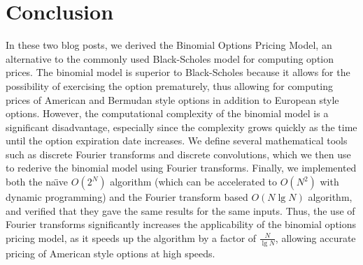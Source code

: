\documentclass[11pt]{article}
\begin{document}
\section*{Conclusion}
In these two blog posts, we derived the Binomial Options Pricing Model, an alternative to the commonly used
Black-Scholes model for computing option prices. The binomial model is superior to Black-Scholes
because it allows for the possibility of exercising the option prematurely, thus allowing for
computing prices of American and Bermudan style options in addition to European style options.
However, the computational complexity of the binomial model is a significant disadvantage,
especially since the complexity grows quickly as the time until the option expiration date
increases. We define several mathematical tools such as discrete Fourier transforms and discrete
convolutions, which we then use to rederive the binomial model using Fourier transforms. Finally, we
implemented both the na\"{\i}ve $O(2^N)$ algorithm (which can be accelerated to $O(N^2)$ with
dynamic programming) and the Fourier transform based $O(N \lg N)$ algorithm, and verified that they
gave the same results for the same inputs. Thus, the use of Fourier transforms significantly
increases the applicability of the binomial options pricing model, as it speeds up the algorithm by
a factor of $\frac{N}{\lg N}$, allowing accurate pricing of American style options at high speeds.
\end{document}
